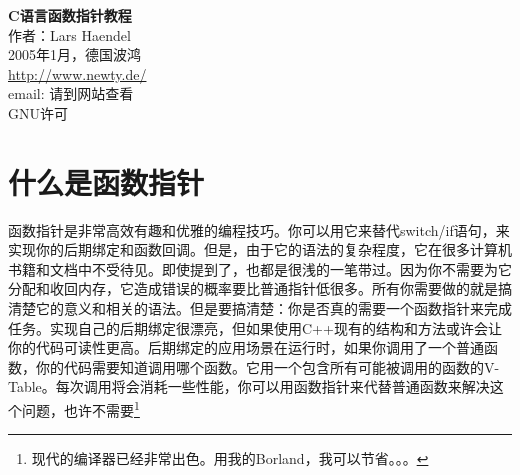 \documentclass[11pt,a4paper]{article}
\begin{document}
\fancyhead{}
\renewcommand{\headrulewidth}{0pt}
\begin{center}
\textbf{\huge{C语言函数指针教程}}\\
作者：Lars Haendel\\
2005年1月，德国波鸿\\
\href{http://www.newty.de/}{http://www.newty.de/}\\
email: 请到网站查看\\
GNU许可
\end{center}

\tableofcontents

\section{什么是函数指针}
函数指针是非常高效有趣和优雅的编程技巧。你可以用它来替代switch/if语句，来实现你的后期绑定和函数回调。但是，由于它的语法的复杂程度，它在很多计算机书籍和文档中不受待见。即使提到了，也都是很浅的一笔带过。因为你不需要为它分配和收回内存，它造成错误的概率要比普通指针低很多。所有你需要做的就是搞清楚它的意义和相关的语法。但是要搞清楚：你是否真的需要一个函数指针来完成任务。实现自己的后期绑定很漂亮，但如果使用C++现有的结构和方法或许会让你的代码可读性更高。后期绑定的应用场景在运行时，如果你调用了一个普通函数，你的代码需要知道调用哪个函数。它用一个包含所有可能被调用的函数的V-Table。每次调用将会消耗一些性能，你可以用函数指针来代替普通函数来解决这个问题，也许不需要\footnote{现代的编译器已经非常出色。用我的Borland，我可以节省。。。}
\end{document}

